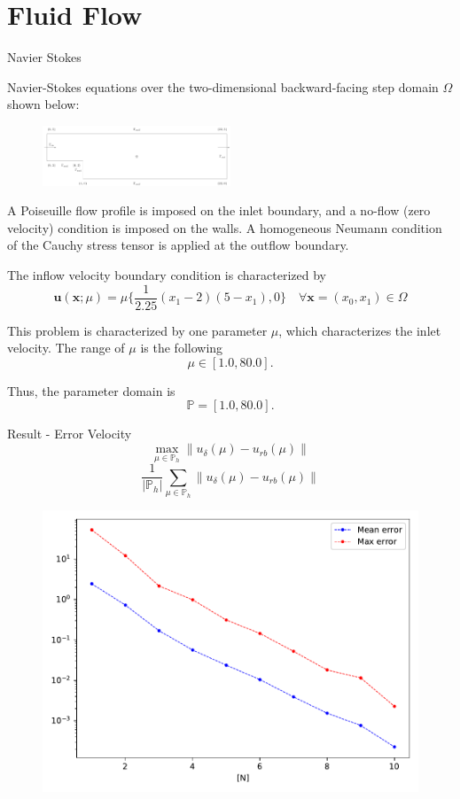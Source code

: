 \documentclass[9pt]{beamer}
\begin{document}
\section[Navier Stokes]{Fluid Flow} 
\begin{frame}{Navier Stokes}

Navier-Stokes equations over the two-dimensional backward-facing step domain $\Omega$ shown below:

\begin{figure}
    \centering
    \includegraphics[width=0.5\textwidth]{channel.png}

\end{figure}

A Poiseuille flow profile is imposed on the inlet boundary, and a no-flow (zero velocity) condition is imposed on the walls. A homogeneous Neumann condition of the Cauchy stress tensor is applied at the outflow boundary.

The inflow velocity boundary condition is characterized by $$\boldsymbol{u}(\boldsymbol{x};\mu)=\mu\bigg \{\frac{1}{2.25}(x_1-2)(5-x_1),0\bigg \} \quad \forall \boldsymbol{x}=(x_0,x_1) \in \Omega$$ 

This problem is characterized by one parameter $\mu$, which characterizes the inlet velocity. The range of $\mu$ is the following $$\mu \in [1.0, 80.0].$$ 

Thus, the parameter domain is $$\mathbb{P}=[1.0,80.0].$$

\end{frame}

\begin{frame}{Result - Error Velocity}
$$\max_{\mu \in \mathbb{P}_h} \|u_{\delta}(\mu) - u_{rb}(\mu)\|$$
$$\frac{1}{|\mathbb{P}_h|} \sum_{\mu \in \mathbb{P}_h} \|u_{\delta}(\mu) - u_{rb}(\mu)\|$$
\begin{figure}
    \centering
    \includegraphics[height=0.55\paperheight]{output_error_u.pdf}
\end{figure}
\end{frame}
\end{document}
